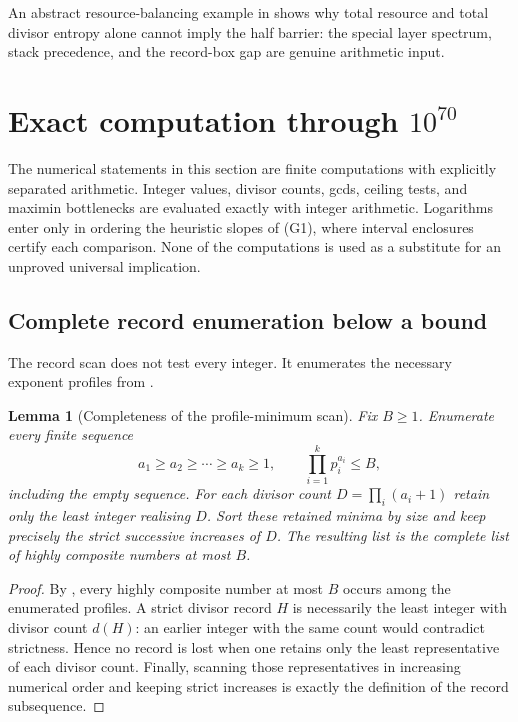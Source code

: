\documentclass[11pt]{article}
\numberwithin{equation}{section}
\theoremstyle{blueplain}
\newtheorem{lemma}[theorem]{Lemma}
\theoremstyle{bluedef}
\begin{document}
An abstract resource-balancing example in  shows why total resource and total divisor entropy alone cannot imply the half barrier: the special layer spectrum, stack precedence, and the record-box gap are genuine arithmetic input.

\section{Exact computation through \texorpdfstring{$10^{70}$}{10 to the 70}}
\label{sec:computation}

The numerical statements in this section are finite computations with explicitly separated arithmetic.  Integer values, divisor counts, gcds, ceiling tests, and maximin bottlenecks are evaluated exactly with integer arithmetic.  Logarithms enter only in ordering the heuristic slopes of (G1), where interval enclosures certify each comparison.  None of the computations is used as a substitute for an unproved universal implication.

\subsection{Complete record enumeration below a bound}

The record scan does not test every integer.  It enumerates the necessary exponent profiles from .

\begin{lemma}[Completeness of the profile-minimum scan]
\label{lem:enumeration-completeness}
Fix $B\ge1$.  Enumerate every finite sequence
\begin{equation}
 a_1\ge a_2\ge\cdots\ge a_k\ge1,
 \qquad
 \prod_{i=1}^k p_i^{a_i}\le B,
 \label{eq:enumerated-profiles}
\end{equation}
including the empty sequence.  For each divisor count $D=\prod_i(a_i+1)$ retain only the least integer realising $D$.  Sort these retained minima by size and keep precisely the strict successive increases of $D$.  The resulting list is the complete list of highly composite numbers at most $B$.
\end{lemma}

\begin{proof}
By , every highly composite number at most $B$ occurs among the enumerated profiles.  A strict divisor record $H$ is necessarily the least integer with divisor count $d(H)$: an earlier integer with the same count would contradict strictness.  Hence no record is lost when one retains only the least representative of each divisor count.  Finally, scanning those representatives in increasing numerical order and keeping strict increases is exactly the definition of the record subsequence.
\end{proof}
\end{document}
